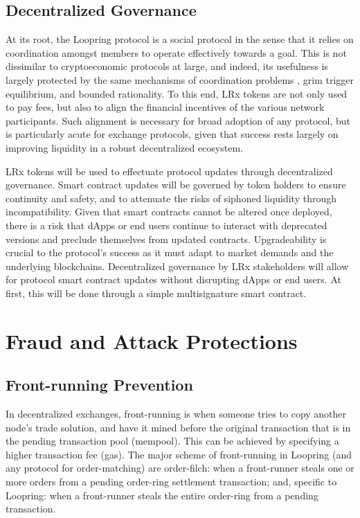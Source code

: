 \documentclass[UTF8,nofonts]{article}
\begin{document}
\begin{multicols}{2}
\subsection{Decentralized Governance}
At its root, the Loopring protocol is a social protocol in the sense that it relies on coordination amongst members to operate effectively towards a goal. This is not dissimilar to cryptoeconomic protocols at large, and indeed, its usefulness is largely protected by the same mechanisms of coordination problems \cite{vitalikgovernance}, grim trigger equilibrium, and bounded rationality. To this end, LRx tokens are not only used to pay fees, but also to align the financial incentives of the various network participants. Such alignment is necessary for broad adoption of any protocol, but is particularly acute for exchange protocols, given that success rests largely on improving liquidity in a robust decentralized ecosystem.

LRx tokens will be used to effectuate protocol updates through decentralized governance. Smart contract updates will be governed by token holders to ensure continuity and safety, and to attenuate the risks of siphoned liquidity through incompatibility. Given that smart contracts cannot be altered once deployed, there is a risk that dApps or end users continue to interact with deprecated versions and preclude themselves from updated contracts. Upgradeability is crucial to the protocol's success as it must adapt to market demands and the underlying blockchains. Decentralized governance by LRx stakeholders will allow for protocol smart contract updates without disrupting dApps or end users. At first, this will be done through a simple multisignature smart contract.

\section{Fraud and Attack Protections}

\subsection{Front-running Prevention\label{sec:dual_authoring}}

In decentralized exchanges, front-running is when someone tries to copy another node's trade solution, and have it mined before the original transaction that is in the pending transaction pool (mempool). This can be achieved by specifying a higher transaction fee (gas). The major scheme of front-running in Loopring (and any protocol for order-matching) are order-filch: when a front-runner steals one or more orders from a pending order-ring settlement transaction; and, specific to Loopring: when a front-runner steals the entire order-ring from a pending transaction.



\end{multicols}
\end{document}
